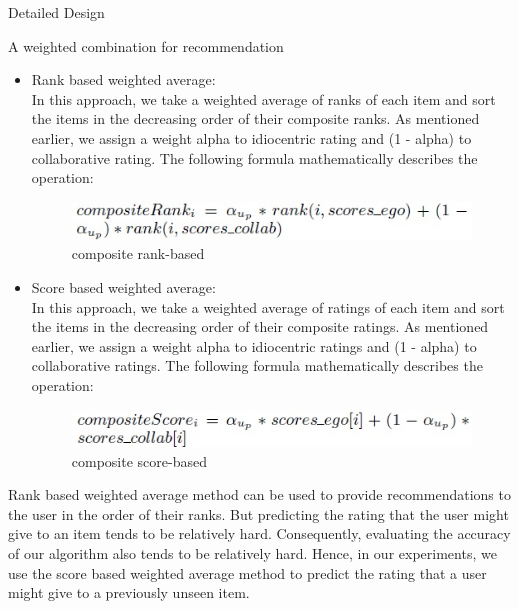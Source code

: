 \documentclass{report}
\begin{document}
\begin{projChapter}{Detailed Design}
\begin{projSection}{A weighted combination for recommendation}
\begin{itemize}
  \item Rank based weighted average:
                    ~\\
                    In this approach, we take a weighted average of ranks of each item and sort the items in the decreasing order of their composite ranks. As mentioned earlier, we assign a weight alpha to idiocentric rating and (1 - alpha) to collaborative rating. The following formula mathematically describes the operation:
                    \begin{figure}[ht!]
\centering
\includegraphics[scale=0.8]{images/compositeRank.png}
\caption{composite rank-based}
\label{compositeRank}
\end{figure}


  \item Score based weighted average:
                    ~\\
                    In this approach, we take a weighted average of ratings of each item and sort the items in the decreasing order of their composite ratings. As mentioned earlier, we assign a weight alpha to idiocentric ratings and (1 - alpha) to collaborative ratings. The following formula mathematically describes the operation:
                    \begin{figure}[ht!]
\centering
\includegraphics[scale=0.8]{images/compositeScore.png}
\caption{composite score-based}
\label{compositeScore}
\end{figure}


\end{itemize}

            Rank based weighted average method can be used to provide recommendations to the user in the order of their ranks. But predicting the rating that the user might give to an item tends to be relatively hard. Consequently, evaluating the accuracy of our algorithm also tends to be relatively hard. Hence, in our experiments, we use the score based weighted average method to predict the rating that a user might give to a previously unseen item.
        \end{projSection}
\end{projChapter}
\end{document}
